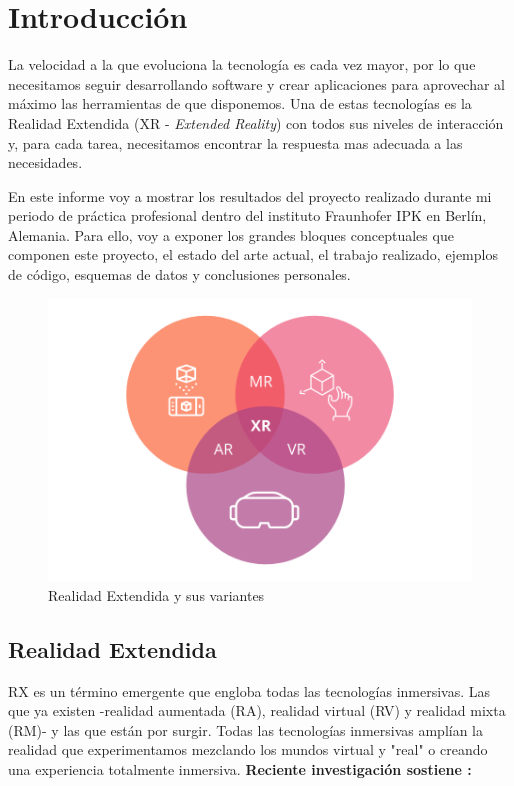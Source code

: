 \chapter*{Introducción}


La velocidad a la que evoluciona la tecnología es cada vez mayor, por lo que necesitamos seguir desarrollando software
y crear aplicaciones para aprovechar al máximo las herramientas de que disponemos. Una de estas tecnologías es la
Realidad Extendida (XR - \textit{Extended Reality}) con todos sus niveles de interacción y, para cada tarea, necesitamos encontrar la respuesta mas adecuada a las necesidades.

En este informe voy a mostrar los resultados del proyecto realizado durante mi periodo de práctica profesional dentro del instituto Fraunhofer IPK en Berlín, Alemania.
Para ello, voy a exponer los grandes bloques conceptuales que componen este proyecto, el estado del arte actual, el trabajo realizado, ejemplos de código, esquemas de datos y conclusiones personales.

\begin{figure}[ht]
    \begin{center}
       \includegraphics[width=0.6\linewidth]{introduction/figures/Extended-Reality.png}
    \end{center}
    \caption[Realidad Extendida y sus variantes]
    {\footnotesize Realidad Extendida y sus variantes}
    \label{fig:mufigure1}
 \end{figure}


\section{Realidad Extendida}

RX es un término emergente que engloba todas las tecnologías inmersivas. Las que ya existen -realidad aumentada (RA), realidad virtual (RV) y realidad mixta (RM)- y las que están por surgir. Todas las tecnologías inmersivas amplían la realidad que experimentamos mezclando los mundos virtual y "real" o creando una experiencia totalmente inmersiva.
\textbf{Reciente investigación sostiene : }


